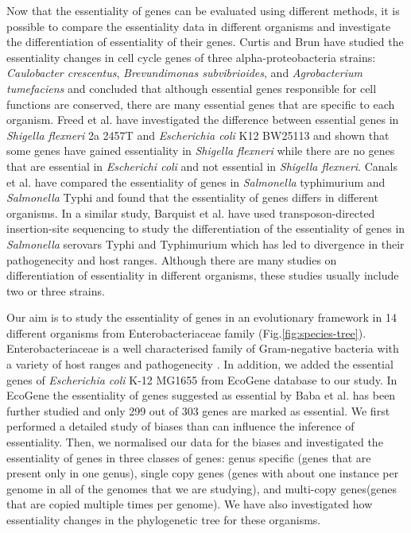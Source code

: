 \documentclass[12pt,letterpaper]{article}
\begin{document}
Now that the essentiality of genes can be evaluated using different methods, it is possible to compare the essentiality data in different organisms and investigate the differentiation of essentiality of their genes. Curtis and Brun \cite{curtis_identification_2014} have studied the essentiality changes in cell cycle genes of three alpha-proteobacteria strains: \textit{Caulobacter crescentus}, \textit{Brevundimonas subvibrioides}, and \textit{Agrobacterium tumefaciens} and concluded that although essential genes responsible for cell functions are conserved, there are many essential genes that are specific to each organism. Freed et al.\@ \cite{freed_combining_2016} have investigated the difference between essential genes in \textit{Shigella flexneri} 2a 2457T and \textit{Escherichia coli} K12 BW25113 and shown that some genes have gained essentiality in \textit{Shigella flexneri} while there are no genes that are essential in \textit{Escherichi coli} and not essential in \textit{Shigella flexneri}. Canals et al.\@ \cite{canals_high-throughput_2012} have compared the essentiality of genes in \textit{Salmonella} typhimurium and \textit{Salmonella} Typhi and found that the essentiality of genes differs in different organisms. In a similar study, Barquist et al.\@ \cite{barquist_comparison_2013} have used transposon-directed insertion-site sequencing to study the differentiation of the essentiality of genes in \textit{Salmonella} serovars Typhi and Typhimurium which has led to divergence in their pathogenecity and host ranges. Although there are many studies on differentiation of essentiality in different organisms, these studies usually include two or three strains.

Our aim is to study the essentiality of genes in an evolutionary framework in 14 different organisms from Enterobacteriaceae family (Fig.\@ \ref{fig:species-tree}). Enterobacteriaceae is a well characterised family of Gram-negative bacteria with a variety of host ranges and pathogenecity \cite{brenner_bergeys_2006}. In addition, we added the essential genes of \textit{Escherichia coli} K-12 MG1655 from EcoGene database \cite{zhou_ecogene_2013} to our study. In EcoGene the essentiality of genes suggested as essential by Baba et al.\@ \cite{baba_construction_2006} has been further studied and only 299 out of 303 genes are marked as essential. We first performed a detailed study of biases than can influence the inference of essentiality. Then, we normalised our data for the biases and investigated the essentiality of genes in three classes of genes: genus specific (genes that are present only in one genus), single copy genes (genes with about one instance per genome in all of the genomes that we are studying), and multi-copy genes(genes that are copied multiple times per genome). We have also investigated how essentiality changes in the phylogenetic tree for these organisms.
\end{document}

